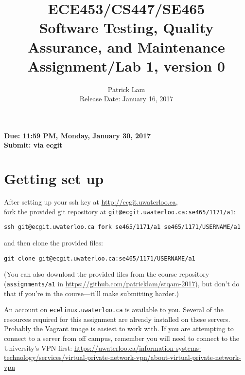 \documentclass[10pt,hidelinks]{article}
\begin{document}
\title{
ECE453/CS447/SE465 \\
Software Testing, Quality Assurance, and Maintenance\\
Assignment/Lab 1, version 0}
\author{Patrick Lam \\
{Release Date:  January 16, 2017} \\
}
\renewcommand{\today}{}
\maketitle

\begin{center}

{\bf Due:  11:59 PM, Monday, January 30, 2017} \\
{\bf Submit: via ecgit }\\
\end{center}



\section*{Getting set up}
After setting up your ssh key at \url{http://ecgit.uwaterloo.ca}, \\ fork the provided git repository at {\tt git@ecgit.uwaterloo.ca:se465/1171/a1}:

\begin{center}
{\tt ssh git@ecgit.uwaterloo.ca fork se465/1171/a1 se465/1171/USERNAME/a1}
\end{center}

\noindent and then clone the provided files:

\begin{center}
{\tt git clone git@ecgit.uwaterloo.ca:se465/1171/USERNAME/a1}
\end{center}

(You can also download the provided
files from the course repository ({\tt assignments/a1} in \url{https://github.com/patricklam/stqam-2017}),
but don't do that if you're in the course---it'll make submitting harder.)

An account on {\tt ecelinux.uwaterloo.ca} is available to you.
Several of the resources required for this assignment are already installed on these servers. Probably the Vagrant image is easiest to work with.
If you are attempting to connect to a server from off campus, remember you will need to connect to the University's VPN first: \url{https://uwaterloo.ca/information-systems-technology/services/virtual-private-network-vpn/about-virtual-private-network-vpn}
\end{document}
